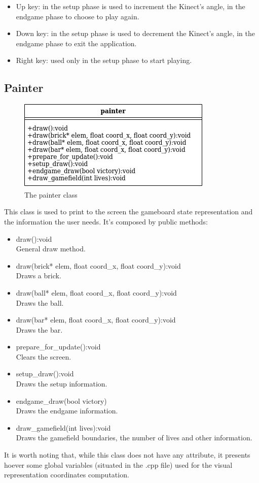 \documentclass[]{article}
\begin{document}
\begin{itemize}
			 \begin{itemize}
				\item Up key: in the setup phase is used to increment the Kinect's angle, in the endgame phase to choose to play again.
				\item Down key: in the setup phase is used to decrement the Kinect's angle, in the endgame phase to exit the application.
				\item Right key: used only in the setup phase to start playing. 
			 \end{itemize}
	\end{itemize}
\newpage
\subsection{Painter}
\begin{figure}[h!]
    \centering
    \includegraphics[scale=0.5]{painter.jpg}
    \caption{The painter class}
    \label{fig:painter class diagram }
\end{figure}
This class is used to print to the screen the gameboard state representation and the information the user needs. It's composed by public methods:
\begin{itemize}
		\item draw():void \\ General draw method.
		\item draw(brick* elem, float coord\_x, float coord\_y):void\\ Draws a brick.
		\item draw(ball* elem, float coord\_x, float coord\_y):void\\ Draws the ball.
		\item draw(bar* elem, float coord\_x, float coord\_y):void\\ Draws the bar.
		\item prepare\_for\_update():void\\ Clears the screen.
		\item setup\_draw():void\\Draws the setup information.
		\item endgame\_draw(bool victory)\\Draws the endgame information.
		\item draw\_gamefield(int lives):void\\Draws the gamefield boundaries, the number of lives and other information.
	\end{itemize}
It is worth noting that, while this class does not have any attribute, it presents hoever some global variables (situated in the .cpp file) used for the visual representation coordinates computation.
\newpage
\end{document}
